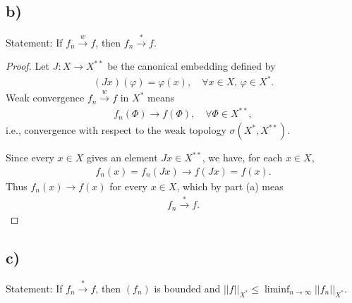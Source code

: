 \documentclass{article}
\begin{document}
\subsection*{b)}

Statement: If $f_{n} \stackrel{w}{\rightarrow}  f$, then $f_{n} \xrightarrow{*} f$.

\begin{proof}
    Let \( J : X \to X^{**} \) be the canonical embedding defined by
    \begin{align}
        (Jx)(\varphi) = \varphi(x), \quad \forall x \in X, \, \varphi \in X^*.
    \end{align}
    Weak convergence \( f_n \xrightarrow{w} f \) in \( X^* \) means
    \begin{align}
        f_n(\Phi) \to f(\Phi), \quad \forall \Phi \in X^{**},
    \end{align}
    i.e., convergence with respect to the weak topology \( \sigma(X^*, X^{**}) \).

    Since every \( x \in X \) gives an element \( Jx \in X^{**} \), we have, for each \( x \in X \),
    \begin{align}
        f_n(x) = f_n(Jx) \longrightarrow f(Jx) = f(x).
    \end{align}
    Thus \( f_n(x) \to f(x) \) for every \( x \in X \), which by part (a) meas
    \begin{align}
        f_n \xrightarrow{*} f.
    \end{align}

\end{proof}


\subsection*{c)}

Statement: If $f_{n} \xrightarrow{*} f$, then $(f_{n})$ is bounded and $||f||_{X^{*}}\le \liminf_{n \to \infty}||f_{n}||_{X^{*}}$.
\end{document}
